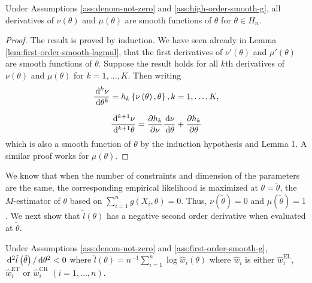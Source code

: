 \begin{lemma}
\label{lem:mul-el-smooth-lagrange-mul-1}Under Assumptions \ref{ass:denom-not-zero} and \ref{ass:high-order-smooth-g}, all derivatives of $\nu\left(\theta\right)$
and $\mu\left(\theta\right)$ are smooth functions of $\theta$ for
$\theta\in H_n$.\end{lemma}
\begin{proof}
The result is proved by induction. We have seen already in Lemma \ref{lem:first-order-smooth-lagmul}, that 
the first derivatives of  $\nu'\left(\theta\right)$ and $\mu'\left(\theta\right)$
are smooth functions of $\theta$. Suppose the result holds for all
$k$th derivatives of $\nu\left(\theta\right)$ and $\mu\left(\theta\right)$
for $k=1,\ldots,K$. Then writing 
\[
\frac{\,\mathrm{d}^{k}\nu}{\,\mathrm{d}\theta^{k}}=h_{k}\left\{ \nu\left(\theta\right),\theta\right\} ,k=1,\ldots,K,
\]
 
\[
\frac{\,\mathrm{d}^{k+1}\nu}{\,\mathrm{d}^{k+1}\theta}=\frac{\partial h_{k}}{\partial\nu}\frac{\,\mathrm{d}\nu}{\,\mathrm{d}\theta}+\frac{\partial h_{k}}{\partial\theta}
\]
which is also a smooth function of $\theta$ by the induction hypothesis
and Lemma 1. A similar proof works for $\mu\left(\theta\right)$.
\end{proof}
We know that when the number of constraints and dimension of the parameters
are the same, the corresponding empirical likelihood is maximized
at $\theta=\tilde{\theta}$, the $M$-estimator of $\theta$ based on
$\sum_{i=1}^{n}g\left(X_{i},\theta\right)=0$. Thus, $\nu\left(\tilde{\theta}\right)=0$
and $\mu\left(\tilde{\theta}\right)=1$. We next show that $\tilde{l}\left(\theta\right)$
has a negative second order derivative when evaluated at $\tilde{\theta}$.
\begin{lemma}
\label{lem:bell-shape-el} %
 Under  Assumptions \ref{ass:denom-not-zero} and \ref{ass:first-order-smooth-g},
$\,\mathrm{d}^{2}\tilde{l}\left(\tilde{\theta}\right)/\,\mathrm{d}\theta^{2}<0$
where $\tilde{l}\left(\theta\right)=n^{-1}\sum_{i=1}^{n}\log\hat{w}_{i}\left(\theta\right)$
where $\hat{w}_{i}$ is either $\hat{w}_{i}^{\mathrm{EL}}$, $\hat{w}_{i}^{\mathrm{ET}}$
or $\hat{w}_{i}^{\mathrm{CR}}$ $\left(i=1,\ldots,n\right)$.\end{lemma}
